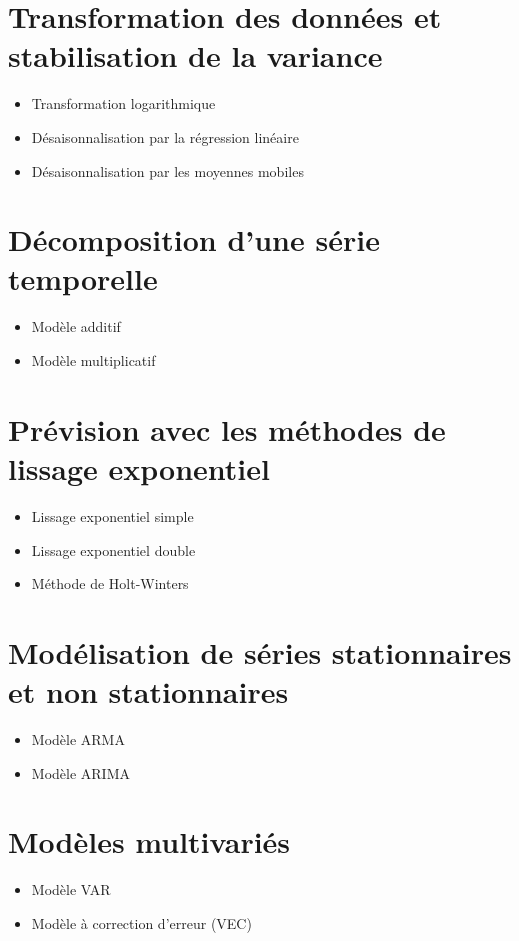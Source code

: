 \documentclass{article}
\begin{document}
\section{Transformation des données et stabilisation de la variance}

\begin{itemize}[noitemsep]
\item Transformation logarithmique
\item Désaisonnalisation par la régression linéaire 
\item Désaisonnalisation par les moyennes mobiles
\end{itemize}


\section{Décomposition d’une série temporelle}

\begin{itemize}[noitemsep]
\item Modèle additif
\item Modèle multiplicatif
\end{itemize}


\section{Prévision avec les méthodes de lissage exponentiel}

\begin{itemize}[noitemsep]
\item Lissage exponentiel simple
\item Lissage exponentiel double
\item Méthode de Holt-Winters
\end{itemize}

\section{Modélisation de séries stationnaires et non stationnaires}

\begin{itemize}[noitemsep]
\item Modèle ARMA
\item Modèle ARIMA
\end{itemize}


\section{Modèles multivariés}

\begin{itemize}[noitemsep]
\item Modèle VAR
\item Modèle à correction d'erreur (VEC)
\end{itemize}
\end{document}
